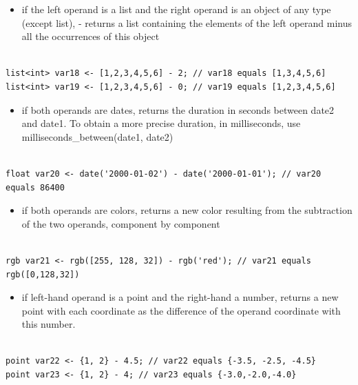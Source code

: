 \documentclass[]{book}
\providecommand{\tightlist}{%
  \setlength{\itemsep}{0pt}\setlength{\parskip}{0pt}}
\theoremstyle{definition}
\theoremstyle{definition}
\theoremstyle{definition}
\theoremstyle{remark}
\begin{document}
\begin{itemize}
\tightlist
\item
  if the left operand is a list and the right operand is an object of
  any type (except list), - returns a list containing the elements of
  the left operand minus all the occurrences of this object
\end{itemize}

\begin{verbatim}
 
list<int> var18 <- [1,2,3,4,5,6] - 2; // var18 equals [1,3,4,5,6] 
list<int> var19 <- [1,2,3,4,5,6] - 0; // var19 equals [1,2,3,4,5,6]
\end{verbatim}

\begin{itemize}
\tightlist
\item
  if both operands are dates, returns the duration in seconds between
  date2 and date1. To obtain a more precise duration, in milliseconds,
  use milliseconds\_between(date1, date2)
\end{itemize}

\begin{verbatim}
 
float var20 <- date('2000-01-02') - date('2000-01-01'); // var20 equals 86400
\end{verbatim}

\begin{itemize}
\tightlist
\item
  if both operands are colors, returns a new color resulting from the
  subtraction of the two operands, component by component
\end{itemize}

\begin{verbatim}
 
rgb var21 <- rgb([255, 128, 32]) - rgb('red'); // var21 equals rgb([0,128,32])
\end{verbatim}

\begin{itemize}
\tightlist
\item
  if left-hand operand is a point and the right-hand a number, returns a
  new point with each coordinate as the difference of the operand
  coordinate with this number.
\end{itemize}

\begin{verbatim}
 
point var22 <- {1, 2} - 4.5; // var22 equals {-3.5, -2.5, -4.5} 
point var23 <- {1, 2} - 4; // var23 equals {-3.0,-2.0,-4.0}
\end{verbatim}
\end{document}
